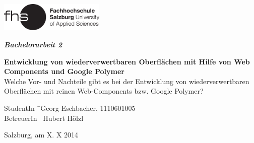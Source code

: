 \begin{titlepage}
\begin{center}

\includegraphics[width=5cm]{images/FHSLogo.pdf}

\vspace*{4cm}

\Large{
  \textit{\textbf{Bachelorarbeit 2}}
}

\vspace*{4cm}

\large{
  \textbf{Entwicklung von wiederverwertbaren Oberflächen mit Hilfe von Web Components und Google Polymer}\\
  \textnormal{Welche Vor- und Nachteile gibt es bei der Entwicklung von wiederverwertbaren Oberflächen mit reinen Web-Components bzw. Google Polymer?}
}

\end{center}

\vfill

\begin{tabbing}
StudentIn \= \ Georg Eschbacher, 1110601005 \\
BetreuerIn \> \ Hubert Hölzl

\end{tabbing}

Salzburg, am X. X 2014
\end{titlepage}
